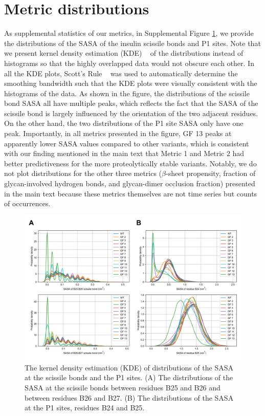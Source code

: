 \documentclass[sn-vancouver]{sn-jnl}
\begin{document}
\section{Metric distributions}
As supplemental statistics of our metrics, in Supplemental Figure \ref{SASA_distribution}, we provide the distributions of the SASA of the insulin scissile bonds and P1 sites. Note that we present kernel density estimation (KDE) ~\cite{davis2011remarks, parzen1962estimation} of the distributions instead of histograms so that the highly overlapped data would not obscure each other. In all the KDE plots, Scott's Rule ~\cite{scott2015multivariate} was used to automatically determine the smoothing bandwidth such that the KDE plots were visually consistent with the histograms of the data. As shown in the figure, the distributions of the scissile bond SASA all have multiple peaks, which reflects the fact that the SASA of the scissile bond is largely influenced by the orientation of the two adjacent residues. On the other hand, the two distributions of the P1 site SASA only have one peak. Importantly, in all metrics presented in the figure, GF 13 peaks at apparently lower SASA values compared to other variants, which is consistent with our finding mentioned in the main text that Metric 1 and Metric 2 had better predictiveness for the more proteolytically stable variants. Notably, we do not plot distributions for the other three metrics ($\beta$-sheet propensity, fraction of glycan-involved hydrogen bonds, and glycan-dimer occlusion fraction) presented in the main text because these metrics themselves are not time series but counts of occurrences. 

\renewcommand{\thefigure}{S\arabic{figure}}
\begin{figure}[H]
\centering
\includegraphics[width=\textwidth]{Figures/Fig_SASA_distribution.png}
\caption{The kernel density estimation (KDE) of distributions of the SASA at the scissile bonds and the P1 sites. (A) The distributions of the SASA at the scissile bonds between residues B25 and B26 and between residues B26 and B27. (B) The distributions of the SASA at the P1 sites, residues B24 and B25.}
\label{SASA_distribution}
\end{figure}
\end{document}
